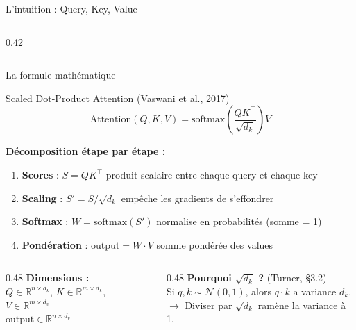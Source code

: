 \documentclass[aspectratio=169, 11pt]{beamer}
\begin{document}
\begin{frame}{L'intuition : Query, Key, Value}
\begin{columns}
\begin{column}{0.42\textwidth}
\end{column}
\end{columns}
\end{frame}

\begin{frame}{La formule mathématique}
\begin{block}{Scaled Dot-Product Attention (Vaswani et al., 2017)}
\vspace{-0.5em}
\[
\boxed{\text{Attention}(Q, K, V) = \text{softmax}\!\left(\frac{QK^\top}{\sqrt{d_k}}\right) V}
\]
\end{block}

\vspace{0.3em}

\textbf{Décomposition étape par étape :}
\begin{enumerate}
    \item \textbf{Scores} : $S = QK^\top$ \hfill produit scalaire entre chaque query et chaque key
    \item \textbf{Scaling} : $S' = S / \sqrt{d_k}$ \hfill empêche les gradients de s'effondrer
    \item \textbf{Softmax} : $W = \text{softmax}(S')$ \hfill normalise en probabilités (somme = 1)
    \item \textbf{Pondération} : $\text{output} = W \cdot V$ \hfill somme pondérée des values
\end{enumerate}

\vspace{0.5em}

\begin{columns}
\begin{column}{0.48\textwidth}
\textbf{Dimensions :}\\
$Q \in \mathbb{R}^{n \times d_k}$, \;
$K \in \mathbb{R}^{m \times d_k}$, \;
$V \in \mathbb{R}^{m \times d_v}$\\
$\text{output} \in \mathbb{R}^{n \times d_v}$
\end{column}
\begin{column}{0.48\textwidth}
\textbf{Pourquoi $\sqrt{d_k}$ ?} (Turner, §3.2)\\
Si $q, k \sim \mathcal{N}(0,1)$, alors $q \cdot k$ a variance $d_k$.\\
$\rightarrow$ Diviser par $\sqrt{d_k}$ ramène la variance à 1.
\end{column}
\end{columns}
\end{frame}
\end{document}
